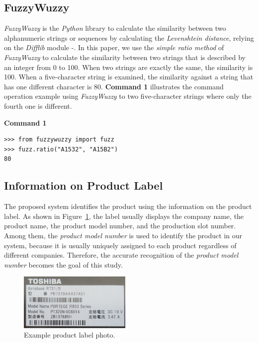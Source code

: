 \documentclass[technicalreport]{ieicej}
\begin{document}
    \subsection{FuzzyWuzzy}
        {\em FuzzyWuzzy} is the {\em Python} library to calculate the similarity between two alphanumeric strings or sequences by calculating the {\em Levenshtein distance}, relying on the {\em Difflib} module \cite{fuzzywuzzy}-\cite{fuzzywuzzy-git}. In this paper, we use the {\em simple ratio method} of {\em FuzzyWuzzy} to calculate the similarity between two strings that is described by an integer from 0 to 100. When two strings are exactly the same, the similarity is 100. When a five-character string is examined, the similarity against a string that has one different character is $80$. {\bf Command 1} illustrates the command operation example using {\em FuzzyWuzzy} to two five-character strings where only the fourth one is different.
     
        \begin{center}\bf Command 1\end{center}
        \begin{lstlisting}
>>> from fuzzywuzzy import fuzz
>>> fuzz.ratio("A1532", "A15B2")
80      \end{lstlisting}

    \subsection{Information on Product Label}
        The proposed system identifies the product using the information on the product label. As shown in Figure~\ref{fig:label-exp}, the label usually displays the company name, the product name, the product model number, and the production slot number. Among them, the {\em product model number} is used to identify the product in our system, because it is usually uniquely assigned to each product regardless of different companies. Therefore, the accurate recognition of the {\em product model number} becomes the goal of this study.

            \begin{figure}[t] 
                \begin{center}
                \includegraphics[width=0.48\textwidth]{figure/label-exp.png}
                \end{center}
                \caption{Example product label photo.}
                \label{fig:label-exp}
            \end{figure}
\end{document}
